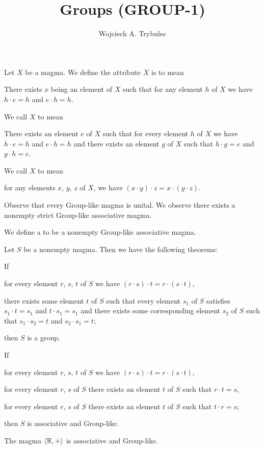 \documentclass{article}
\title{Groups (GROUP-1)}
\author{Wojciech A. Trybulec}
\begin{document}
\maketitle
\begin{definition}
Let $X$ be a magma. We define the attribute $X$ is  to
mean
\begin{defn}
\item There exists $x$ being an element of $X$ such that for any element
  $h$ of $X$ we have $h\cdot e=h$ and $e\cdot h=h$.
\end{defn}
We call $X$  to mean
\begin{defn}
\item There exists an element $e$ of $X$ such that for every element $h$
  of $X$ we have $h\cdot e=h$ and $e\cdot h=h$ and there exists an element $g$ of
  $X$ such that $h\cdot g=e$ and $g\cdot h=e$.
\end{defn}
We call $X$  to mean
\begin{defn}
\item for any elements $x$, $y$, $z$ of $X$, we have $(x\cdot y)\cdot z=x\cdot (y\cdot z)$.
\end{defn}
\end{definition}

Observe that every Group-like magma is unital. We observe there exists a
nonempty strict Group-like associative magma.

\begin{definition}
We define a  to be a nonempty Group-like associative magma.
\end{definition}

Let $S$ be a nonempty magma. Then we have the following theorems:
\begin{thm}
\item\label{group1:1} If \begin{enumerate*}[label=(\roman*)]
\item for every element $r$, $s$, $t$ of $S$ we have $(r\cdot s)\cdot t=r\cdot (s\cdot t)$,
\item there exists some element $t$ of $S$ such that every element
  $s_{1}$ of $S$ satisfies $s_{1}\cdot t=s_{1}$ and $t\cdot s_{1}=s_{1}$ and there
  exists some corresponding element $s_{2}$ of $S$ such that $s_{1}\cdot s_{2}=t$ and $s_{2}\cdot s_{1}=t$;
\end{enumerate*}
  then $S$ is a group.
\item\label{group1:2} If \begin{enumerate*}[label=(\roman*)]
\item for every element $r$, $s$, $t$ of $S$ we have $(r\cdot s)\cdot t=r\cdot (s\cdot t)$,
\item for every element $r$, $s$ of $S$ there exists an element $t$ of
  $S$ such that $r\cdot t=s$,
\item for every element $r$, $s$ of $S$ there exists an element $t$ of
  $S$ such that $t\cdot r=s$;
\end{enumerate*}
  then $S$ is associative and Group-like.
\item\label{group1:3} The magma $\langle \mathbb{R},+\rangle$ is associative
  and Group-like.
\end{thm}
\end{document}
